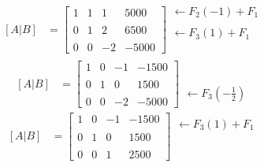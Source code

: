 \documentclass[10pt, a4paper]{article}
\begin{document}
  \begin{align*}
    \left[A|B\right]&=\left[
      \begin{array}{ccc|c}
        1 & 1 & 1 & 5000 \\\\
        0 & 1 & 2 & 6500 \\\\
        0 & 0 & -2 & -5000
      \end{array}
    \right]
    \begin{array}{r}
      \leftarrow F_2\left(-1\right)+F_1
      \\\\
      \leftarrow F_3\left(1\right)+F_1
      \\\\\\
    \end{array}
  \end{align*}
  \begin{align*}
    \left[A|B\right]&=\left[
      \begin{array}{ccc|c}
        1 & 0 & -1 & -1500 \\\\
        0 & 1 & 0 & 1500 \\\\
        0 & 0 & -2 & -5000
      \end{array}
    \right]
    \begin{array}{r}
      \\\\\\\\
      \leftarrow F_3\left(-\frac{1}{2}\right)
    \end{array}
  \end{align*}
  \begin{align*}
    \left[A|B\right]&=\left[
      \begin{array}{ccc|c}
        1 & 0 & -1 & -1500 \\\\
        0 & 1 & 0 & 1500 \\\\
        0 & 0 & 1 & 2500
      \end{array}
    \right]
    \begin{array}{r}
      \leftarrow F_3\left(1\right)+F_1
      \\\\\\\\
      \\
    \end{array}
  \end{align*}
\end{document}
